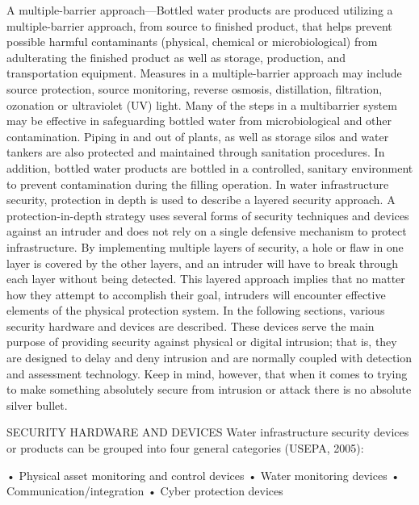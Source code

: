 \documentclass{article}
\begin{document}
A multiple-barrier approach---Bottled water products are produced
utilizing a multiple-barrier approach, from source to finished product,
that helps prevent possible harmful contaminants (physical, chemical or
microbiological) from adulterating the finished product as well as
storage, production, and transportation equipment. Measures in a
multiple-barrier approach may include source protection, source
monitoring, reverse osmosis, distillation, filtration, ozonation or
ultraviolet (UV) light. Many of the steps in a multibarrier system may
be effective in safeguarding bottled water from microbiological and
other contamination. Piping in and out of plants, as well as storage
silos and water tankers are also protected and maintained through
sanitation procedures. In addition, bottled water products are bottled
in a controlled, sanitary environment to prevent contamination during
the filling operation. In water infrastructure security, protection in
depth is used to describe a layered security approach. A
protection-in-depth strategy uses several forms of security techniques
and devices against an intruder and does not rely on a single defensive
mechanism to protect infrastructure. By implementing multiple layers of
security, a hole or flaw in one layer is covered by the other layers,
and an intruder will have to break through each layer without being
detected. This layered approach implies that no matter how they attempt
to accomplish their goal, intruders will encounter effective elements of
the physical protection system. In the following sections, various
security hardware and devices are described. These devices serve the
main purpose of providing security against physical or digital
intrusion; that is, they are designed to delay and deny intrusion and
are normally coupled with detection and assessment technology. Keep in
mind, however, that when it comes to trying to make something absolutely
secure from intrusion or attack there is no absolute silver bullet.

SECURITY HARDWARE AND DEVICES Water infrastructure security devices or
products can be grouped into four general categories (USEPA, 2005):

• Physical asset monitoring and control devices • Water monitoring
devices • Communication/integration • Cyber protection devices
\end{document}
